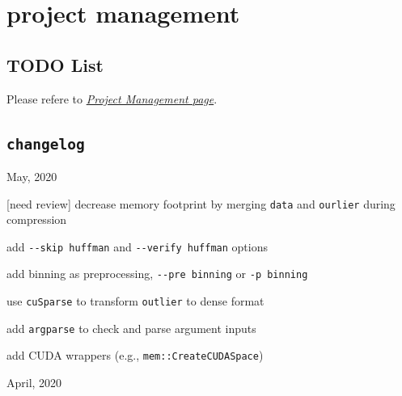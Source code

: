 \section{project management}

\subsection{TODO List}

Please refere to
\href{https://github.com/hipdac-lab/cuSZ/projects/2}{\emph{Project
Management page}}.

\subsection{\texorpdfstring{\texttt{changelog}}{changelog}}

May, 2020

\begin{description}
\tightlist
\item[perf]
{[}need review{]} decrease memory footprint by merging
\passthrough{\lstinline!data!} and \passthrough{\lstinline!ourlier!}
during compression
\item[feature]
add \passthrough{\lstinline!--skip huffman!} and
\passthrough{\lstinline!--verify huffman!} options
\item[feature]
add binning as preprocessing, \passthrough{\lstinline!--pre binning!} or
\passthrough{\lstinline!-p binning!}
\item[prototype]
use \passthrough{\lstinline!cuSparse!} to transform
\passthrough{\lstinline!outlier!} to dense format
\item[feature]
add \passthrough{\lstinline!argparse!} to check and parse argument
inputs
\item[refactor]
add CUDA wrappers (e.g., \passthrough{\lstinline!mem::CreateCUDASpace!})
\end{description}

April, 2020

